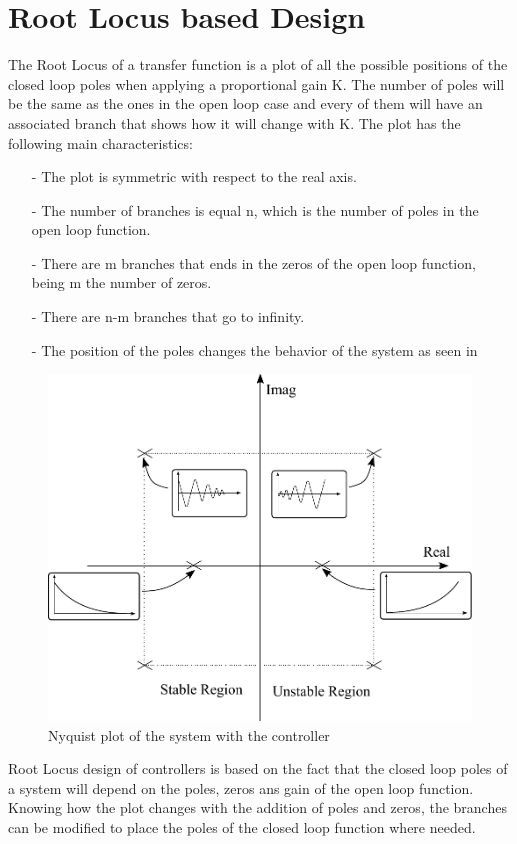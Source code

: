 \section{Root Locus based Design}\label{rLocus}
The Root Locus of a transfer function is a plot of all the possible positions of the closed loop poles when applying a proportional gain K. The number of poles will be the same as the ones in the open loop case and every of them will have an associated branch that shows how it will change with K. The plot has the following main characteristics:

\begin{itemize}
	\item[-] The plot is symmetric with respect to the real axis.
	\item[-] The number of branches is equal n, which is the number of poles in the open loop function.
	\item[-] There are m branches that ends in the zeros of the open loop function, being m the number of zeros.
	\item[-] There are n-m branches that go to infinity.
	\item[-] The position of the poles changes the behavior of the system as seen in 
\end{itemize}

\begin{figure}[H] 
	\centering 
	\includegraphics[scale=0.5]{figures/rLocusStability}	
	\caption{Nyquist plot of the system with the controller}
	\label{rLocusStability}
\end{figure}
Root Locus design of controllers is based on the fact that the closed loop poles of a system will depend on the poles, zeros ans gain of the open loop function. Knowing how the plot changes with the addition of poles and zeros, the branches can be modified to place the poles of the closed loop function where needed.

